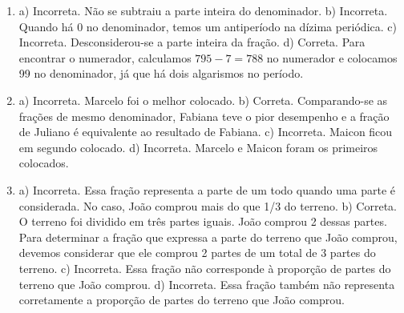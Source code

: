 \begin{enumerate}
\item a) Incorreta. Não se subtraiu a parte inteira do denominador.
b) Incorreta. Quando há 0 no denominador, temos um antiperíodo na dízima periódica.
c) Incorreta. Desconsiderou-se a parte inteira da fração.
d) Correta. Para encontrar o numerador, calculamos $795 - 7 = 788$ no numerador e colocamos 99 no denominador, já que há dois algarismos no período.

\item a) Incorreta. Marcelo foi o melhor colocado.
b) Correta. Comparando-se as frações de mesmo denominador, Fabiana teve o pior desempenho e a fração de Juliano é equivalente ao resultado de Fabiana.
c) Incorreta. Maicon ficou em segundo colocado.
d) Incorreta. Marcelo e Maicon foram os primeiros colocados.

\item a) Incorreta. Essa fração representa a parte de um todo quando uma
parte é considerada. No caso, João comprou mais do que 1/3 do terreno.
b) Correta. O terreno foi dividido em três partes iguais. João
comprou 2 dessas partes. Para determinar a fração que expressa a parte
do terreno que João comprou, devemos considerar que ele comprou 2 partes
de um total de 3 partes do terreno.
c) Incorreta. Essa fração não corresponde à proporção de partes do terreno que João comprou.
d) Incorreta. Essa fração também não representa corretamente a proporção de partes do terreno que João comprou.

\end{enumerate}

